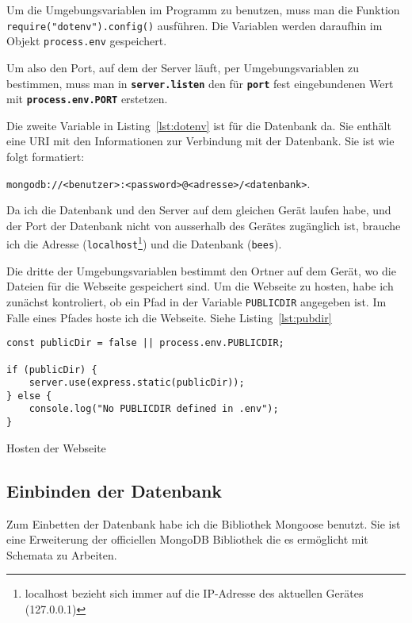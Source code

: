 \documentclass[a4paper, ngerman, 12pt]{scrartcl}
\newcommand{\js}[1]{\texttt{#1}}
\begin{document}
Um die Umgebungsvariablen im Programm zu benutzen, muss man die Funktion \js{require("dotenv").config()} ausführen.
Die Variablen werden daraufhin im Objekt \js{process.env} gespeichert.

Um also den Port, auf dem der Server läuft, per Umgebungsvariablen zu bestimmen, muss man in \textbf{\js{server.listen}} den für \textbf{\texttt{port}} fest eingebundenen Wert mit \textbf{\js{process.env.PORT}} erstetzen.

Die zweite Variable in Listing~\ref{lst:dotenv} ist für die Datenbank da.
Sie enthält eine URI mit den Informationen zur Verbindung mit der Datenbank.
Sie ist wie folgt formatiert:

\texttt{mongodb://<benutzer>:<password>@<adresse>/<datenbank>}.

Da ich die Datenbank und den Server auf dem gleichen Gerät laufen habe, und der Port der Datenbank nicht von ausserhalb des Gerätes zugänglich ist, brauche ich die Adresse (\texttt{localhost}\footnote{localhost bezieht sich immer auf die IP-Adresse des aktuellen Gerätes (127.0.0.1) }) und die Datenbank (\texttt{bees}).

Die dritte der Umgebungsvariablen bestimmt den Ortner auf dem Gerät, wo die Dateien für die Webseite gespeichert sind.
Um die Webseite zu hosten, habe ich zunächst kontroliert, ob ein Pfad in der Variable \texttt{PUBLICDIR} angegeben ist. Im Falle eines Pfades hoste ich die Webseite. Siehe Listing~\ref{lst:pubdir}
\begin{listing}[ht]
\centering
\begin{verbatim}
const publicDir = false || process.env.PUBLICDIR;

if (publicDir) {
    server.use(express.static(publicDir));
} else {
    console.log("No PUBLICDIR defined in .env");
}
\end{verbatim}
\caption{Hosten der Webseite\label{lst:pubdir}}
\end{listing}


\subsection[Einbettung der Datenbank]{Einbinden der Datenbank} %

Zum Einbetten der Datenbank habe ich die Bibliothek Mongoose benutzt. Sie ist eine Erweiterung der officiellen MongoDB Bibliothek die es ermöglicht mit Schemata zu Arbeiten.
\end{document}

